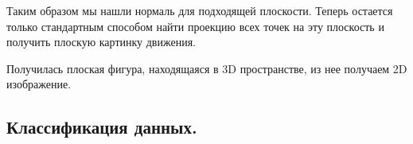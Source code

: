 Таким образом мы нашли нормаль для подходящей плоскости. Теперь остается только стандартным способом найти проекцию всех точек на эту плоскость и получить плоскую картинку движения.
\begin{figure}[H]
\end{figure}
Получилась плоская фигура, находящаяся в 3D пространстве, из нее получаем 2D изображение.
\begin{figure}[H]
\end{figure}
\subsection*{Классификация данных.}

